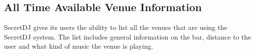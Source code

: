 \subsection{All Time Available Venue Information}
SecretDJ gives its users the ability to list all the venues that are
using the SecretDJ system. The list includes general information on
the bar, distance to the user and what kind of music the venue is
playing.

